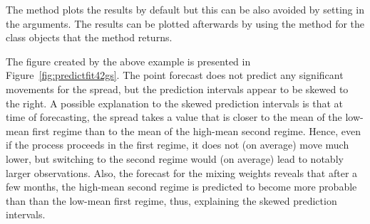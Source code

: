 \documentclass[nojss]{jss} %
\begin{document}
The  method plots the results by default but this can be also avoided by setting  in the arguments. The results can be plotted afterwards by using the  method for the class  objects that the  method returns.

The figure created by the above example is presented in Figure~\ref{fig:predictfit42gs}. The point forecast does not predict any significant movements for the spread, but the prediction intervals appear to be skewed to the right. A possible explanation to the skewed prediction intervals is that at time of forecasting, the spread takes a value that is closer to the mean of the low-mean first regime than to the mean of the high-mean second regime. Hence, even if the process proceeds in the first regime, it does not (on average) move much lower, but switching to the second regime would (on average) lead to notably larger observations. Also, the forecast for the mixing weights reveals that after a few months, the high-mean second regime is predicted to become more probable than than the low-mean first regime, thus, explaining the skewed prediction intervals.
\end{document}
